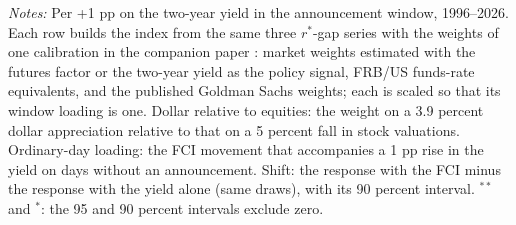 \begin{table}[tp]\centering\small
\caption{Four Calibrations of the Index Weights ($r^*$-Gap Yield and FCI; 12 Lags)}\label{tab:weights4}
\begin{flushleft}\footnotesize\textit{Notes:} Per +1 pp on the two-year yield in the announcement window, 1996--2026. Each row builds the index from the same three $r^*$-gap series with the weights of one calibration in the companion paper \citep{fcinote}: market weights estimated with the futures factor or the two-year yield as the policy signal, FRB/US funds-rate equivalents, and the published Goldman Sachs weights; each is scaled so that its window loading is one. Dollar relative to equities: the weight on a 3.9 percent dollar appreciation relative to that on a 5 percent fall in stock valuations. Ordinary-day loading: the FCI movement that accompanies a 1 pp rise in the yield on days without an announcement. Shift: the response with the FCI minus the response with the yield alone (same draws), with its 90 percent interval. $^{**}$ and $^{*}$: the 95 and 90 percent intervals exclude zero.\end{flushleft}
\end{table}
